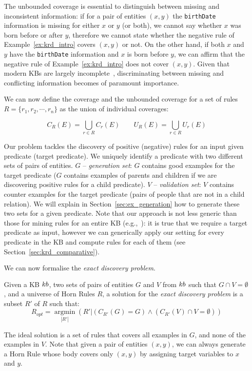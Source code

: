 The unbounded coverage is essential to distinguish between missing and inconsistent information: if for a pair of entities $(x,y)$ the \texttt{birthDate} information is missing for either $x$ or $y$ (or both), we cannot say whether $x$ was born before or after $y$, therefore we cannot state whether
the negative rule of Example~\ref{ex:krd_intro} covers $(x,y)$ or not. On the other hand, if both $x$ and $y$ have the \texttt{birthDate} information and $x$ is born before $y$, we can affirm that the negative rule of Example~\ref{ex:krd_intro} does not cover $(x,y)$. Given that modern KBs are largely incomplete~\cite{dong2014knowledge,min2013distant}, discriminating between missing and conflicting information becomes of paramount importance.

We can now define the coverage and the unbounded coverage for a set of rules $R=\{r_1,r_2,\cdots,r_n\}$ as the union of individual coverages:

$$C_R(E) = \bigcup \limits_{r \in R} C_r(E) \qquad U_R(E) = \bigcup \limits_{r \in R} U_r(E) $$

Our problem tackles the discovery of positive (negative) rules for an input given predicate (target predicate). We uniquely identify a predicate with two different sets of pairs of entities.
$G$ -- \emph{generation set}: $G$ contains good examples for the target predicate ($G$ contains examples of parents and children if we are discovering positive rules for a child predicate).
$V$ -- \emph{validation set}: $V$ contains counter examples for the target predicate (pairs of people that are not in a child relation).
We will explain in Section~\ref{sec:ex_generation} how to generate these two sets for a given predicate. Note that our approach is not less generic than those for mining rules for an entire KB (e.g.,~\cite{abedjan2014amending,galarraga2015fast}): it is true that we require a target predicate as input, however we can generically apply our setting for every predicate in the KB and compute rules for each of them (see Section~\ref{sec:krd_comparative}).

We can now formalise the \emph{exact discovery problem}.
\begin{definition}
	Given a KB ${\sc kb}$, two sets of pairs of entities $G$ and $V$ from ${\sc kb}$ such that $G \cap V = \emptyset$, and a universe of Horn Rules $R$, a solution for the \emph{exact discovery problem} is a subset $R'$ of $R$  such that:
	$$R_{opt}=\underset{|R'|}{\operatorname{argmin}}(R'|(C_{R'}(G) = G) \wedge (C_{R'}(V) \cap V = \emptyset) )$$
\end{definition}
The ideal solution is a set of rules that covers all examples in $G$, and none of the examples in $V$. Note that given a pair of entities $(x,y)$, we can always generate a Horn Rule whose body covers only $(x,y)$ by assigning target variables to $x$ and $y$.

